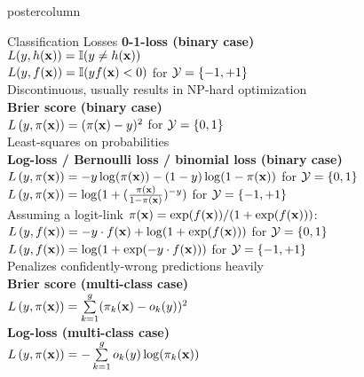 \documentclass{beamer}
\begin{document}
\begin{frame}[fragile]{}
\begin{columns}
\begin{column}{.31\textwidth}
\begin{beamercolorbox}[center]{postercolumn}
\begin{minipage}{.98\textwidth}
{\begin{myblock}{Classification Losses}
\textbf{0-1-loss (binary case)}\\
$L (y, h(\mathbf{x})) = \mathbb{I}(y \neq h(\mathbf{x}))$\\
$L (y, f(\mathbf{x})) = \mathbb{I}( yf(\mathbf{x}) < 0)$ for $\mathcal{Y} = \{-1, +1\}$ \\ 
Discontinuous, usually results in NP-hard optimization\\

\textbf{Brier score (binary case)} \\
$L\left(y, \pi(\mathbf{x})\right) = (\pi(\mathbf{x}) - y)^2$ for $\mathcal{Y} = \{0, 1\}$ \\
Least-squares on probabilities\\


\textbf{Log-loss / Bernoulli loss / binomial loss (binary case)}\\
$L\left(y, \pi(\mathbf{x})\right) = -y \log(\pi(\mathbf{x})) - (1-y) \log(1-\pi(\mathbf{x}))$ for $\mathcal{Y} = \{0, 1\}$ \\
$L\left(y, \pi(\mathbf{x})\right) = \log(1 + (\frac{\pi(\mathbf{x})}{1-\pi(\mathbf{x})})^{-y})$ for $\mathcal{Y} = \{-1, +1\}$ \\

Assuming a logit-link $\pi(\mathbf{x}) = \exp(f(\mathbf{x})) / ( 1+\exp(f(\mathbf{x})))$:\\
$L\left(y, f(\mathbf{x})\right) = -y \cdot f(\mathbf{x}) + \log(1 + \exp(f(\mathbf{x})))$ for $\mathcal{Y} = \{0, 1\}$ \\
$L\left(y, f(\mathbf{x})\right) = \log(1 + \exp(- y \cdot f(\mathbf{x})))$ for $\mathcal{Y} = \{-1, +1\}$ \\
Penalizes confidently-wrong predictions heavily\\

\textbf{Brier score (multi-class case)} \\
$L\left(y, \pi(\mathbf{x})\right) =  \sum\limits_{k=1}^g (\pi_{k}(\mathbf{x}) - o_k(y))^2$ \\

\textbf{Log-loss (multi-class case)} \\
$ L\left(y, \pi(\mathbf{x})\right) =  - \sum\limits_{k=1}^g o_k(y) \log(\pi_{k}(\mathbf{x}))$ \\  %


\end{myblock}}
\end{minipage}
\end{beamercolorbox}
\end{column}
\end{columns}
\end{frame}
\end{document}

